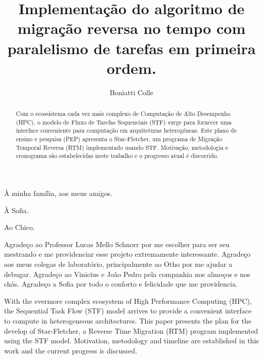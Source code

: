 \documentclass[ppgc,pep]{infufrgs}
\title{Implementação do algoritmo de migração reversa no tempo com paralelismo de tarefas em primeira ordem.}
\author{Boniatti Colle}{Pedro Henrique}
\begin{document}

\maketitle

\begin{dedicatoria}
  À minha família, aos meus amigos.

  À Sofia.

  Ao Chico.
\end{dedicatoria}

\begin{agradecimentos}
	Agradeço ao Professor Lucas Mello Schnorr por me escolher para ser seu mestrando e me providenciar esse projeto extremamente interessante. Agradeço aos meus colegas de laboratório, principalmente ao Otho por me ajudar a debugar. Agradeço ao Vinicius e João Pedro pela companhia nos almoços e nos chás. Agradeço a Sofia por todo o conforto e felicidade que me providencia.
\end{agradecimentos}

\begin{abstract}
	Com o ecossistema cada vez mais complexo de Computação de Alto Desempenho (HPC), o modelo de Fluxo de Tarefas Sequenciais (STF) surge para fornecer uma interface conveniente para computação em arquiteturas heterogêneas. Este plano de ensino e pesquisa (PEP) apresenta o Star-Fletcher, um programa de Migração Temporal Reversa (RTM) implementado usando STF. Motivação, metodologia e cronograma são estabelecidas neste trabalho e o progresso atual é discorrido.
\end{abstract}

\begin{translatedabstract}
	With the evermore complex ecosystem of High Performance Computing (HPC), the Sequential Task Flow (STF) model arrives to provide a convenient interface to compute in heterogeneous architectures. This paper presents the plan for the develop of Star-Fletcher, a Reverse Time Migration (RTM) program implemented using the STF model. Motivation, metodology and timeline are established in this work and the current progress is discussed.
\end{translatedabstract}
\end{document}
